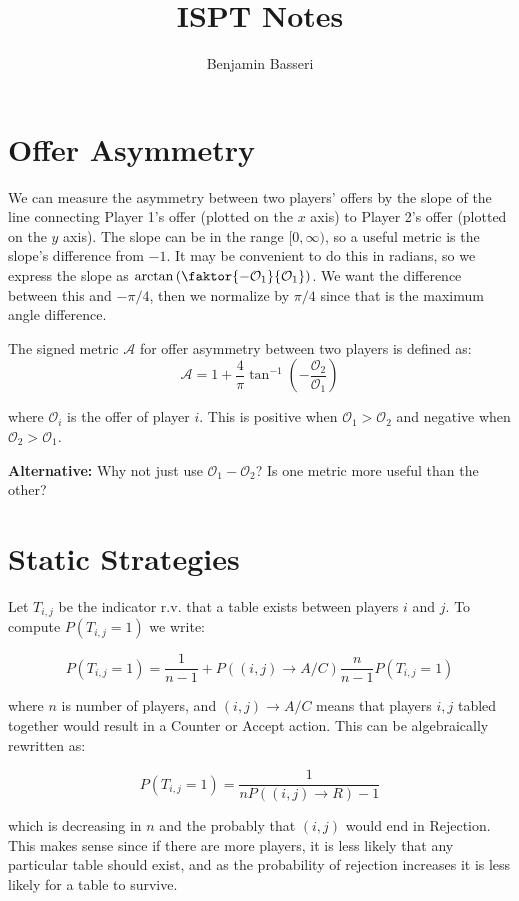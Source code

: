\documentclass{article}
\title{ISPT Notes}
\author{Benjamin Basseri}
\date{ }
\begin{document}
\maketitle

\section{Offer Asymmetry} We can measure the asymmetry between two players' offers by the slope of the line connecting Player 1's offer (plotted on the $x$ axis) to Player 2's offer (plotted on the $y$ axis). The slope can be in the range $[0, \infty)$, so a useful metric is the slope's difference from $-1$. It may be convenient to do this in radians, so we express the slope as $\arctan\left(\faktor{-\mathcal{O}_1}{\mathcal{O}_1}\right)$. We want the difference between this and $-\pi/4$, then we normalize by $\pi/4$ since that is the maximum angle difference.

The signed metric $\mathcal{A}$ for offer asymmetry between two players is defined as:
$$\mathcal{A} = 1 + \frac{4}{\pi}\tan^{-1}\left(-\frac{\mathcal{O}_2}{\mathcal{O}_1}\right)$$

where $\mathcal{O}_i$ is the offer of player $i$. This is positive when $\mathcal{O}_1 > \mathcal{O}_2$ and negative when $\mathcal{O}_2 > \mathcal{O}_1$.

\textbf{Alternative:} Why not just use $\mathcal{O}_1 - \mathcal{O}_2$? Is one metric more useful than the other?

\section{Static Strategies}

Let $T_{i,j}$ be the indicator r.v. that a table exists between players $i$ and $j$. To compute $P(T_{i,j} = 1)$ we write:

$$P(T_{i,j} = 1) = \frac{1}{n-1} + P((i,j) \rightarrow A/C)\frac{n}{n-1}P(T_{i,j} = 1)$$

where $n$ is number of players, and $(i,j) \rightarrow A/C$ means that players $i,j$ tabled together would result in a Counter or Accept action. This can be algebraically rewritten as:

$$P(T_{i,j} = 1) = \frac{1}{nP((i,j) \rightarrow R) - 1}$$

which is decreasing in $n$ and the probably that $(i,j)$ would end in Rejection. This makes sense since if there are more players, it is less likely that any particular table should exist, and as the probability of rejection increases it is less likely for a table to survive.
\end{document}
